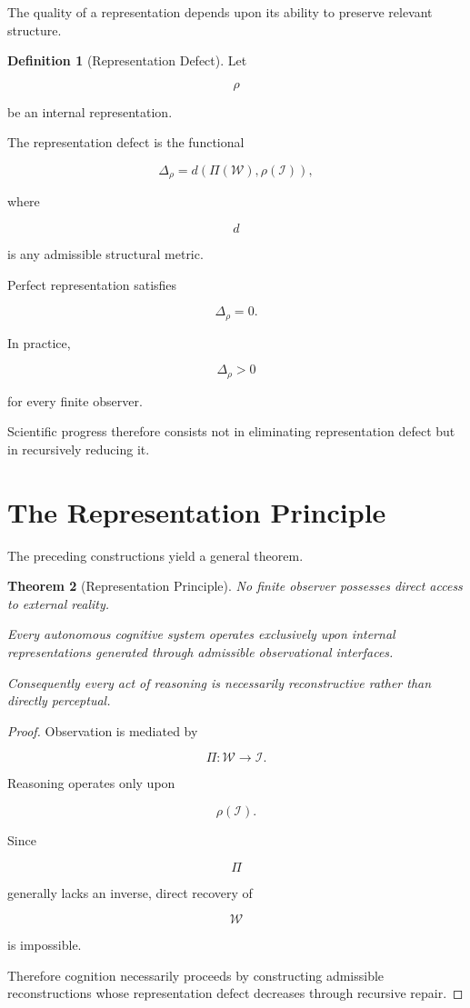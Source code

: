 \documentclass[11pt,oneside]{book}
\numberwithin{equation}{chapter}
\theoremstyle{definition}
\newtheorem{definition}{Definition}[chapter]
\theoremstyle{plain}
\newtheorem{theorem}[definition]{Theorem}
\begin{document}
The quality of a representation depends upon its ability to preserve relevant
structure.

\begin{definition}[Representation Defect]

Let

\[
\rho
\]

be an internal representation.

The representation defect is the functional

\[
\Delta_{\rho}
=
d
\!\left(
\Pi(\mathcal{W}),
\rho(\mathcal{I})
\right),
\]

where

\[
d
\]

is any admissible structural metric.

\end{definition}

Perfect representation satisfies

\[
\Delta_{\rho}=0.
\]

In practice,

\[
\Delta_{\rho}>0
\]

for every finite observer.

Scientific progress therefore consists not in eliminating representation
defect but in recursively reducing it.

\section{The Representation Principle}

The preceding constructions yield a general theorem.

\begin{theorem}[Representation Principle]

No finite observer possesses direct access to external reality.

Every autonomous cognitive system operates exclusively upon internal
representations generated through admissible observational interfaces.

Consequently every act of reasoning is necessarily reconstructive rather than
directly perceptual.

\end{theorem}

\begin{proof}

Observation is mediated by

\[
\Pi:
\mathcal{W}
\rightarrow
\mathcal{I}.
\]

Reasoning operates only upon

\[
\rho(\mathcal{I}).
\]

Since

\[
\Pi
\]

generally lacks an inverse, direct recovery of

\[
\mathcal{W}
\]

is impossible.

Therefore cognition necessarily proceeds by constructing admissible
reconstructions whose representation defect decreases through recursive
repair.

\end{proof}
\end{document}
